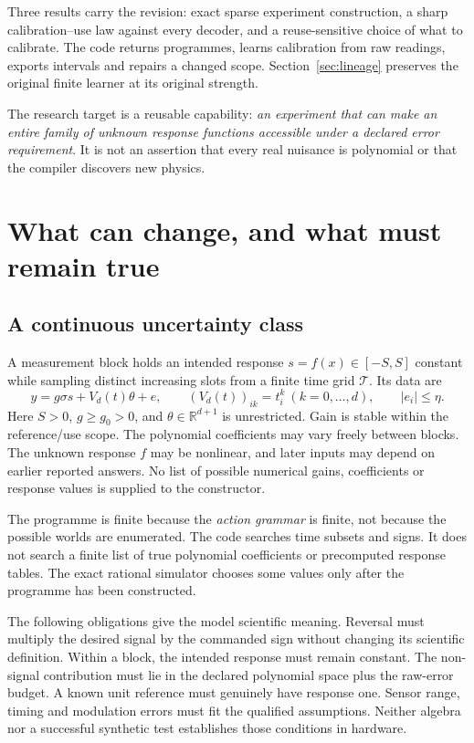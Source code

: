 \documentclass[11pt,letterpaper]{article}
\newcommand{\RR}{\mathbb R}\newcommand{\NN}{\mathbb N}
\theoremstyle{definition}\newtheorem{definition}[theorem]{Definition}
\theoremstyle{remark}\newtheorem{remark}[theorem]{Remark}
\begin{document}
Three results carry the revision: exact sparse experiment construction, a sharp calibration--use law against every decoder, and a reuse-sensitive choice of what to calibrate. The code returns programmes, learns calibration from raw readings, exports intervals and repairs a changed scope. Section~\ref{sec:lineage} preserves the original finite learner at its original strength.

The research target is a reusable capability: \emph{an experiment that can make an entire family of unknown response functions accessible under a declared error requirement}. It is not an assertion that every real nuisance is polynomial or that the compiler discovers new physics.

\section{What can change, and what must remain true}
\label{sec:model}
\subsection{A continuous uncertainty class}
A measurement block holds an intended response $s=f(x)\in[-S,S]$ constant while sampling distinct increasing slots from a finite time grid $\mathcal T$. Its data are
\begin{equation}
 y=g\sigma s+V_d(t)\theta+e,\qquad
 (V_d(t))_{ik}=t_i^k\ (k=0,\ldots,d),\qquad |e_i|\le\eta.
 \label{eq:model}
\end{equation}
Here $S>0$, $g\ge g_0>0$, and $\theta\in\RR^{d+1}$ is unrestricted. Gain is stable within the reference/use scope. The polynomial coefficients may vary freely between blocks. The unknown response $f$ may be nonlinear, and later inputs may depend on earlier reported answers. No list of possible numerical gains, coefficients or response values is supplied to the constructor.

The programme is finite because the \emph{action grammar} is finite, not because the possible worlds are enumerated. The code searches time subsets and signs. It does not search a finite list of true polynomial coefficients or precomputed response tables. The exact rational simulator chooses some values only after the programme has been constructed.

The following obligations give the model scientific meaning. Reversal must multiply the desired signal by the commanded sign without changing its scientific definition. Within a block, the intended response must remain constant. The non-signal contribution must lie in the declared polynomial space plus the raw-error budget. A known unit reference must genuinely have response one. Sensor range, timing and modulation errors must fit the qualified assumptions. Neither algebra nor a successful synthetic test establishes those conditions in hardware.
\end{document}
